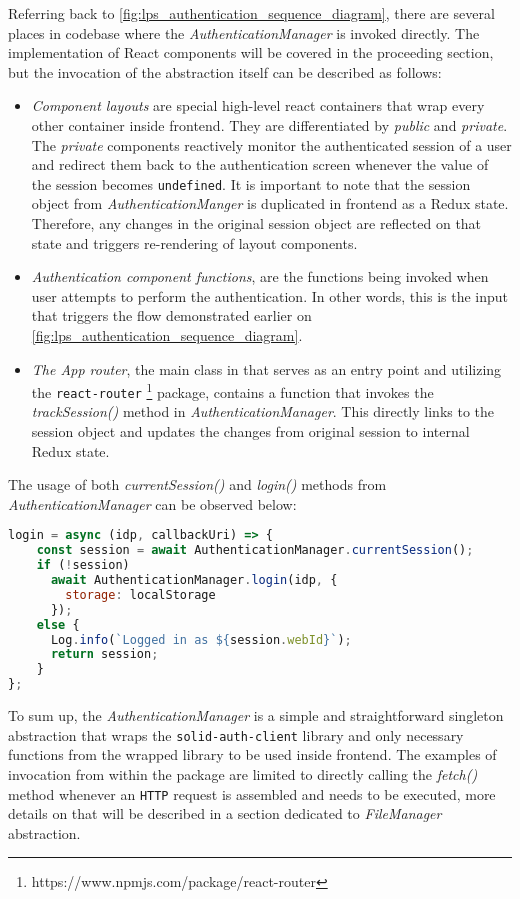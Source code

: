 Referring back to \autoref{fig:lps_authentication_sequence_diagram}, there are several places in \lpa{} codebase where the \textit{AuthenticationManager} is invoked directly. The implementation of React components will be covered in the proceeding section, but the invocation of the abstraction itself can be described as follows:
\begin{itemize}
    \item \textit{Component layouts} are special high-level react containers that wrap every other container inside \lpa{} frontend. They are differentiated by \textit{public} and \textit{private}. The \textit{private} components reactively monitor the authenticated session of a user and redirect them back to the authentication screen whenever the value of the session becomes \texttt{undefined}. It is important to note that the session object from \textit{AuthenticationManger} is duplicated in \lpa{} frontend as a Redux state. Therefore, any changes in the original session object are reflected on that state and triggers re-rendering of layout components. 
    \item \textit{Authentication component functions}, are the functions being invoked when user attempts to perform the authentication. In other words, this is the input that triggers the flow demonstrated earlier on \autoref{fig:lps_authentication_sequence_diagram}.
    \item \textit{The App router}, the main class in \lpa{} that serves as an entry point and utilizing the \texttt{react-router} \footnote{https://www.npmjs.com/package/react-router} package, contains a function that invokes the \textit{trackSession()} method in \textit{AuthenticationManager}. This directly links to the session object and updates the changes from original session to internal Redux state.
\end{itemize}

The usage of both \textit{currentSession()} and \textit{login()} methods from \textit{AuthenticationManager} can be observed below:
\begin{lstlisting}[language=JavaScript]
login = async (idp, callbackUri) => {
    const session = await AuthenticationManager.currentSession();
    if (!session)
      await AuthenticationManager.login(idp, {
        storage: localStorage
      });
    else {
      Log.info(`Logged in as ${session.webId}`);
      return session;
    }
};
\end{lstlisting}

To sum up, the \textit{AuthenticationManager} is a simple and straightforward singleton abstraction that wraps the \texttt{solid-auth-client} library and only necessary functions from the wrapped library to be used inside \lpas{} frontend. The examples of invocation from within the \lpas{} package are limited to directly calling the \textit{fetch()} method whenever an \texttt{HTTP} request is assembled and needs to be executed, more details on that will be described in a section dedicated to \textit{FileManager} abstraction.  


